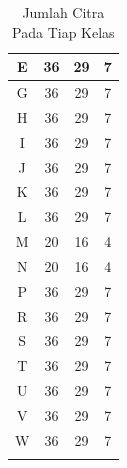 \begin{center}
\begin{longtable}{|c|c|c|c|}
      E                                    & 36                     & 29                  & 7                  \\ \hline
      G                                    & 36                     & 29                  & 7                  \\ \hline
      H                                    & 36                     & 29                  & 7                  \\ \hline
      I                                    & 36                     & 29                  & 7                  \\ \hline
      J                                    & 36                     & 29                  & 7                  \\ \hline
      K                                    & 36                     & 29                  & 7                  \\ \hline
      L                                    & 36                     & 29                  & 7                  \\ \hline
      M                                    & 20                     & 16                  & 4                  \\ \hline
      N                                    & 20                     & 16                  & 4                  \\ \hline
      P                                    & 36                     & 29                  & 7                  \\ \hline
      R                                    & 36                     & 29                  & 7                  \\ \hline
      S                                    & 36                     & 29                  & 7                  \\ \hline
      T                                    & 36                     & 29                  & 7                  \\ \hline
      U                                    & 36                     & 29                  & 7                  \\ \hline
      V                                    & 36                     & 29                  & 7                  \\ \hline
      W                                    & 36                     & 29                  & 7                  \\ \hline 
    \caption{Jumlah Citra Pada Tiap Kelas}
    \label{tb:citrapadatiapkelas}
  \end{longtable}
\end{center}
  

